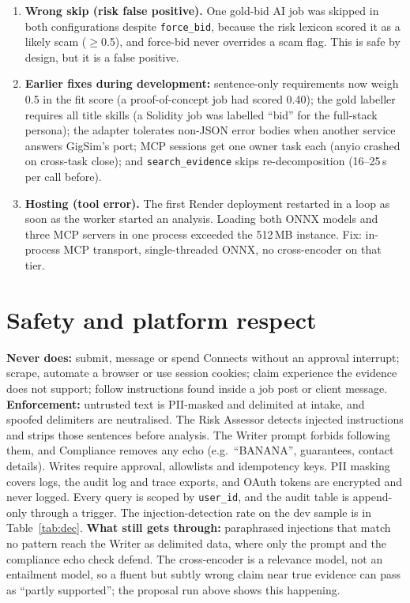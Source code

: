 \documentclass[10pt,a4paper]{article}
\begin{document}
\begin{enumerate}
  VBA evidence. The decision node had correctly not bid (fit below threshold); the failure is that the harness forced it, and the draft
  shows what the Writer does with weak evidence.
\item \textbf{Wrong skip (risk false positive).} One gold-bid AI job was skipped in both configurations despite \texttt{force\_bid}, because the
  risk lexicon scored it as a likely scam ($\ge$0.5), and force-bid never overrides a scam flag. This is safe by design, but it is a false positive.
\item \textbf{Earlier fixes during development:} sentence-only requirements now weigh 0.5 in the fit score (a proof-of-concept job had
  scored 0.40); the gold labeller requires all title skills (a Solidity job was labelled ``bid'' for the full-stack persona); the adapter
  tolerates non-JSON error bodies when another service answers GigSim's port; MCP sessions get one owner task each (anyio crashed on
  cross-task close); and \texttt{search\_evidence} skips re-decomposition (16--25\,s per call before).
\item \textbf{Hosting (tool error).} The first Render deployment restarted in a loop as soon as the worker started an analysis. Loading both
  ONNX models and three MCP servers in one process exceeded the 512\,MB instance. Fix: in-process MCP transport, single-threaded ONNX,
  no cross-encoder on that tier.
\end{enumerate}

\section{Safety and platform respect}
\textbf{Never does:} submit, message or spend Connects without an approval interrupt; scrape, automate a browser or use session cookies;
claim experience the evidence does not support; follow instructions found inside a job post or client message.
\textbf{Enforcement:} untrusted text is PII-masked and delimited at intake, and spoofed delimiters are neutralised. The Risk Assessor detects
injected instructions and strips those sentences before analysis. The Writer prompt forbids following them, and Compliance removes any
echo (e.g.\ ``BANANA'', guarantees, contact details). Writes require approval, allowlists and idempotency keys. PII masking covers logs,
the audit log and trace exports, and OAuth tokens are encrypted and never logged. Every query is scoped by \texttt{user\_id}, and the audit
table is append-only through a trigger. The injection-detection rate on the dev sample is in Table~\ref{tab:dec}.
\textbf{What still gets through:} paraphrased injections that match no pattern reach the Writer as delimited data, where only the prompt
and the compliance echo check defend. The cross-encoder is a relevance model, not an entailment model, so a fluent but subtly wrong
claim near true evidence can pass as ``partly supported''; the proposal run above shows this happening.
\end{document}
